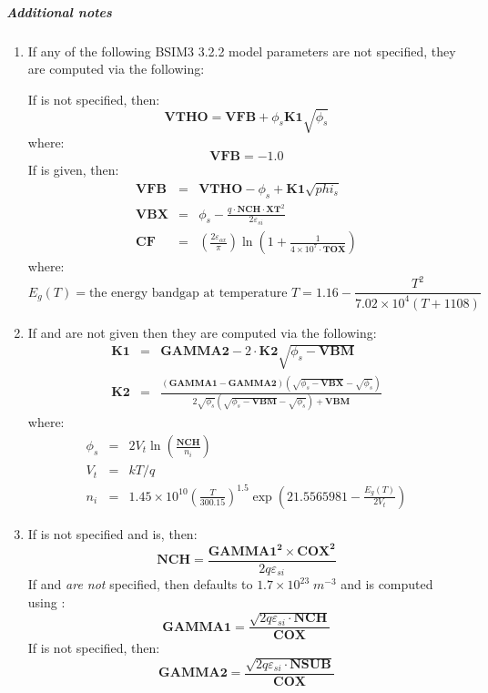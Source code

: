 \subparagraph{Additional notes}
\begin{enumerate}
\item If any of the following BSIM3 3.2.2 model parameters are not specified,
they are computed via the following:

If  is not specified, then:
\[
\mathbf{VTHO} = \mathbf{VFB} + \phi_s \mathbf{K1} \sqrt{\phi_s}
\]
where:
\[
\mathbf{VFB} = -1.0
\]
If  is given, then:
\begin{eqnarray*}
\mathbf{VFB} & = & \mathbf{VTHO} - \phi_s + \mathbf{K1}\sqrt{phi_s} \\
\mathbf{VBX} & = & \phi_s - \frac{q\cdot\mathbf{NCH} \cdot
\mathbf{XT}^2}{2\varepsilon_{si}} \\
\mathbf{CF} & = & \left( \frac{2\varepsilon_{ox}}{\pi} \right)
\ln \left(1 + \frac{1}{4 \times 10^7\cdot\mathbf{TOX}} \right)
\end{eqnarray*}
where:
\[
E_g(T) = \mbox{the energy bandgap at temperature }T = 1.16 - \frac{T^2}{7.02
\times 10^4(T + 1108)}
\]

\item If  and  are not given then they are computed via
the following:
\begin{eqnarray*}
\mathbf{K1} &=& \mathbf{GAMMA2} - 2 \cdot \mathbf{K2} \sqrt{\phi_s -
\mathbf{VBM}} \\
\mathbf{K2} &=& \frac{(\mathbf{GAMMA1} -
\mathbf{GAMMA2})(\sqrt{\phi_s - \mathbf{VBX}} -
\sqrt{\phi_s})}{2\sqrt{\phi_s}(\sqrt{\phi_s - \mathbf{VBM}} -
\sqrt{\phi_s}) + \mathbf{VBM}}
\end{eqnarray*}
where:
\begin{eqnarray*}
\phi_s & = & 2V_t \ln \left(\frac{\mathbf{NCH}}{n_i} \right) \\
V_t    & = & kT / q \\
n_i    & = & 1.45 \times 10^{10} \left(\frac{T}{300.15}
\right)^{1.5} \exp \left(21.5565981 - \frac{E_g(T)}{2V_t} \right)
\end{eqnarray*}

\item If  is not specified and  is, then:
\[
\mathbf{NCH} = \frac{\mathbf{GAMMA1^2 \times \mathbf{COX}^2}}
{2q \varepsilon_{si}}
\]
If  and  {\em are not} specified, then
 defaults to $1.7\times10^{23}\;m^{-3}$ and  is
computed using :
\[
\mathbf{GAMMA1} = \frac{\sqrt{2q\varepsilon_{si} \cdot \mathbf{NCH}}}
{\mathbf{COX}}
\]
If  is not specified, then:
\[
\mathbf{GAMMA2} = \frac{\sqrt{2q\varepsilon_{si} \cdot \mathbf{NSUB}}}
{\mathbf{COX}}
\]


\end{enumerate}
